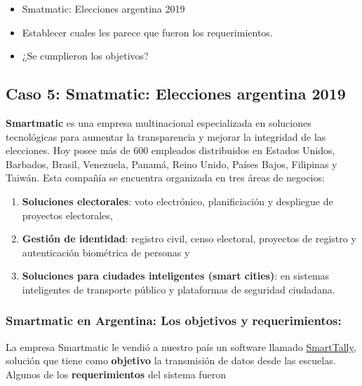 \documentclass[titlepage,a4paper,twoside]{article}
\begin{document}
    \begin{itemize}
    	\item Smatmatic: Elecciones argentina 2019
    	\item Establecer cuales les parece que fueron los requerimientos.
    	\item ¿Se cumplieron los objetivos?
    \end{itemize}

    \subsection{Caso 5: Smatmatic: Elecciones argentina 2019}
    
    
    \textbf{Smartmatic} es una empresa multinacional especializada en soluciones tecnológicas para aumentar la transparencia y mejorar la integridad de las elecciones. Hoy posee más de $600$ empleados distribuidos en Estados Unidos, Barbados, Brasil, Venezuela, Panamá, Reino Unido, Países Bajos, Filipinas y Taiwán. Esta compañía se encuentra organizada en tres áreas de negocios: 
    \begin{enumerate}
    	\item \textbf{Soluciones electorales}: voto electrónico, planificiación y despliegue de proyectos electorales,
    	\item \textbf{Gestión de identidad}: registro civil, censo electoral, proyectos de registro y autenticación biométrica de personas y
    	\item \textbf{Soluciones para ciudades inteligentes (smart cities)}: en sistemas inteligentes de transporte público y plataformas de seguridad ciudadana.
    \end{enumerate}
    
    
    \subsubsection{Smartmatic en Argentina: Los objetivos y requerimientos:}
    
    La empresa Smartmatic le vendió a nuestro país un software llamado \href{https://www.smartmatic.com/es/elecciones/elecciones-manuales/smarttally/}{SmartTally}, solución que tiene como \textbf{objetivo} la transmisión de datos desde las escuelas. Algunos de los \textbf{requerimientos} del sistema fueron
    
\end{document}
